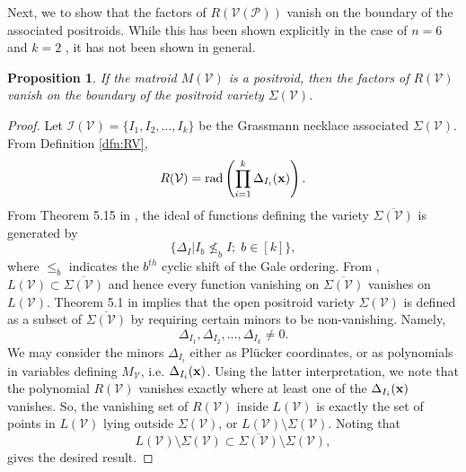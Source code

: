 \documentclass[11pt]{article}
\newcommand{\cP}{\mathcal{P}}
\newcommand{\cV}{\mathcal{V}}
\newcommand{\VP}{\cV(\cP)}
\newcommand{\cI}{\mathcal{I}}
\newtheorem{prop}[thm]{Proposition}
\theoremstyle{remark}
\theoremstyle{definition}
\begin{document}
Next, we to show that the factors of $R(\VP)$ vanish on the boundary of the associated positroids. While this has been shown explicitly in the case of $n = 6$ and $k=2$ \cite{casestudy}, it has not been shown in general.


\begin{prop}\label{res:vanishonbdny} 
If the matroid $M(\cV)$ is a positroid, then the factors of $R(\cV)$ vanish on the boundary of the positroid variety $\Sigma(\cV)$.
\end{prop}


\begin{proof}
Let $\cI(\cV) = \{I_1, I_2, \dots, I_k\}$ be the Grassmann necklace associated $\Sigma(\cV)$. From Definition \ref{dfn:RV}, 
%
\begin{displaymath}
R(\cV) = \mathrm{rad}\left(\prod_{i = 1}^{k} \Delta_{I_i}(\bf{x})\right).
\end{displaymath}
%
From Theorem 5.15 in \cite{Juggling}, the ideal of functions defining the variety $\overline{\Sigma(\cV)}$ is generated by
\begin{displaymath}
\{\Delta_I | I_b \not \leq_b I; \; b \in [k]\},
\end{displaymath}
where $\leq_b$ indicates the $b^{th}$ cyclic shift of the Gale ordering. From \cite[Theorem 5.1]{basisshapeloci}, $L(\cV) \subset \overline{\Sigma(\cV)}$ and hence every function vanishing on $\overline{\Sigma(\cV)}$ vanishes on $L(\cV)$. Theorem 5.1 in \cite{Juggling} implies that the open positroid variety $\Sigma(\cV)$ is defined as a subset of $\overline{\Sigma(\cV)}$ by requiring certain minors to be non-vanishing. Namely, 
%
\begin{displaymath}
\Delta_{I_1}, \Delta_{I_2}, \dots, \Delta_{I_k} \neq 0.
\end{displaymath}
%
We may consider the minors $\Delta_{I_i}$ either as Pl\"{u}cker coordinates, or as polynomials in variables defining $M_{\cV}$, i.e. $\Delta_{I_i}(\bf{x})$. Using the latter interpretation, we note that the polynomial $R(\cV)$ vanishes exactly where at least one of the $\Delta_{I_i}(\bf{x})$ vanishes. So, the vanishing set of $R(\cV)$ inside $L(\cV)$ is exactly the set of points in $L(\cV)$ lying outside $\Sigma(\cV)$, or $L(\cV) \setminus \Sigma(\cV)$. Noting that
%
\begin{displaymath}
L(\cV) \setminus \Sigma(\cV) \subset \overline{\Sigma(\cV)} \setminus \Sigma(\cV), 
\end{displaymath} gives the desired result.
\end{proof}
\end{document}
